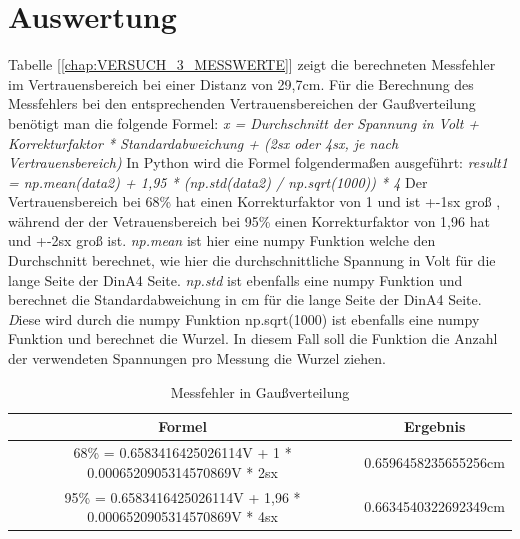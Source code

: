 \documentclass[12pt, oneside, a4paper, \docLanguage]{report}
\begin{document}
\section{Auswertung}
\label{chap:VERSUCH_3_AUSWERTUNG}
Tabelle [\ref{chap:VERSUCH_3_MESSWERTE}] zeigt die berechneten Messfehler im Vertrauensbereich bei einer Distanz von 29,7cm.
Für die Berechnung des Messfehlers bei den entsprechenden Vertrauensbereichen der Gaußverteilung benötigt man die folgende Formel:
\newline
\textit{x = Durchschnitt der Spannung in Volt + Korrekturfaktor * Standardabweichung + (2sx oder 4sx, je nach Vertrauensbereich)}
\newline 
\newline 
In Python wird die Formel folgendermaßen ausgeführt:
\newline 
\textit{result1 = np.mean(data2) + 1,95 * (np.std(data2) / np.sqrt(1000)) * 4}
Der Vertrauensbereich bei 68\% hat einen Korrekturfaktor von 1 und  ist +-1sx groß  , während der der Vetrauensbereich bei 95\% einen Korrekturfaktor von 1,96 hat und +-2sx groß ist.
\newline 
\textit{np.mean} ist hier eine numpy Funktion welche den Durchschnitt berechnet, wie hier die durchschnittliche Spannung in Volt für die lange Seite der DinA4 Seite.
\newline 
\newline 
\textit{np.std} ist ebenfalls eine numpy Funktion und berechnet die Standardabweichung in cm für die lange Seite der DinA4 Seite.
\newline 
\textit
Diese wird durch die numpy Funktion { np.sqrt(1000)} ist ebenfalls eine numpy Funktion und berechnet die Wurzel. In diesem Fall soll die Funktion die Anzahl der verwendeten Spannungen pro Messung die Wurzel ziehen. 
\begin{table}[H]
	\centering\small
	\begin{tabular}{|c|c|}
		\hline
		 Formel &  Ergebnis \\
		\hline
		68\% = 0.6583416425026114V + 1 * 0.0006520905314570869V * 2sx & 0.6596458235655256cm \\
		\hline
		95\% = 0.6583416425026114V + 1,96 * 0.0006520905314570869V * 4sx & 0.6634540322692349cm \\
		\hline
	\end{tabular}
	\caption{Messfehler in Gaußverteilung}
	\label{fig:VERSUCH_3_MESSFEHLER_TABELLE}
\end{table}
\end{document}
